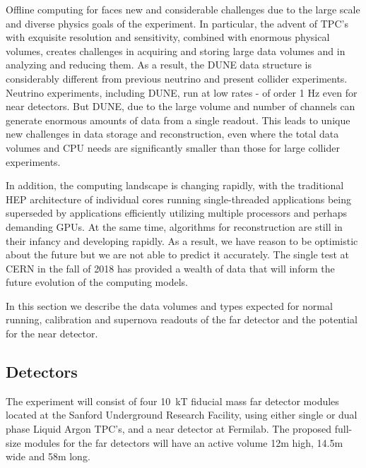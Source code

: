 
Offline computing for   faces new and considerable challenges due to the large scale and diverse physics goals of the experiment.  In particular, the advent of  TPC's with exquisite resolution and sensitivity, combined with enormous physical volumes, creates challenges in acquiring and storing large data volumes and in analyzing and reducing them.  
As a result, the DUNE data structure is considerably different from previous neutrino and present collider experiments. Neutrino experiments, including DUNE, run at low rates - of order 1 Hz even for near detectors. But DUNE, due to the large volume and number of channels can generate enormous amounts of data from a single readout.
This leads to unique new challenges in data storage and reconstruction, even where the total data volumes and CPU needs are significantly smaller than those for large collider experiments.  

In addition, the computing landscape is changing rapidly, with the traditional HEP architecture of individual cores running single-threaded applications being superseded by applications efficiently utilizing multiple processors and perhaps demanding GPUs. At the same time, algorithms for  reconstruction are still in their infancy and developing rapidly.  As a result, we have reason to be optimistic about the future but we are not able to predict it accurately.  The  single test at CERN in the fall of 2018 has provided a wealth of data that will inform the future evolution of  the  computing models.

In this section we describe the data volumes and types expected for normal running, calibration and supernova readouts of the far detector and the potential for the near detector. 



\subsection{Detectors}


The  experiment will consist of four 10~kT fiducial mass far detector modules located at  the Sanford Underground Research Facility, using either single or dual phase Liquid Argon TPC's, and a near detector at Fermilab.
The proposed  full-size  modules for the far detectors will  have an active volume 12m high, 14.5m wide and 58m long. 

